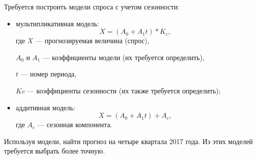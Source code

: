 Требуется построить модели спроса с учетом сезонности:
\begin{itemize}
\item мультипликативная модель:
  \begin{equation*}
    X = (A_0 + A_1t)*K_c,
  \end{equation*}
  \hspace{1.5mm} где \( X \) --- прогнозируемая величина (спрос), \par
  \( A_0 \) и \( A_1 \) --- коэффициенты модели (их требуется определить), \par
  \( t \) --- номер периода, \par
  \( Kc \) --- коэффициенты сезонности (их также требуется определить);
\item аддитивная модель:
  \begin{equation*}
    X = (A_0 + A_1t)+A_c,
  \end{equation*}
  \hspace{1.5mm} где \( A_c \) --- сезонная компонента.
\end{itemize}

Используя модели, найти прогноз на четыре квартала 2017 года.
Из этих моделей требуется выбрать более точную.
